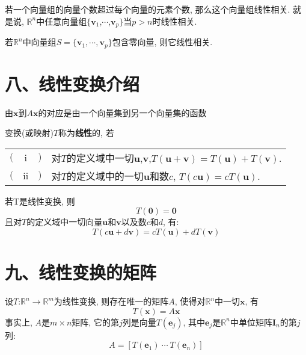 \begin{theorem}
若一个向量组的向量个数超过每个向量的元素个数, 那么这个向量组线性相关. 就是说, $\mathbb{R}^n$中任意向量组$\{\bm{v}_1$,$\cdots$,$\bm{v}_p\}$当$p>n$时线性相关.
\end{theorem}\vspace{4ex}

\begin{theorem}
若$\mathbb{R}^n$中向量组$S=\{\bm{v}_1,\cdots,\bm{v}_p\}$包含零向量, 则它线性相关.
\end{theorem}\vspace{4ex}

\section{八、线性变换介绍}
由$\bm{x}$到$A\bm{x}$的对应是由一个向量集到另一个向量集的函数\\[2ex]

\begin{definition}
变换(或映射)$T$称为\textbf{线性}的, 若\\
\begin{tabular}{l@{}c@{}l@{\hspace{2pt}}l}
$($ & i & $)$ & 对$T$的定义域中一切$\bm{u}$,$\bm{v}$,$T(\bm{u}+\bm{v})=T(\bm{u})+T(\bm{v})$.\\
$($ & ii & $)$ & 对$T$的定义域中的一切$\bm{u}$和数$c$, $T(c\bm{u})=cT(\bm{u})$.
\end{tabular}
\end{definition}\vspace{4ex}

\begin{law}
若T是线性变换, 则
\[T(\bm{0})=\bm{0}\]
且对$T$的定义域中一切向量$\bm{u}$和$\bm{v}$以及数$c$和$d$, 有:
\[T(c\bm{u}+d\bm{v})=cT(\bm{u})+dT(\bm{v})\]
\end{law}\vspace{6ex}

\section{九、线性变换的矩阵}
\begin{theorem}
设$T$:$\mathbb{R}^n\rightarrow\mathbb{R}^m$为线性变换, 则存在唯一的矩阵$A$, 使得对$\mathbb{R}^n$中一切$\bm{x}$, 有
\[T(\bm{x})=A\bm{x}\]
事实上, $A$是$m\times n$矩阵, 它的第$j$列是向量$T(\bm{e}_j)$, 其中$\bm{e}_j$是$\mathbb{R}^n$中单位矩阵$\bm{I}_n$的第$j$列:
\[A=[T(\bm{e}_1)\ \cdots\ T(\bm{e}_n)]\]
\end{theorem}\vspace{4ex}

